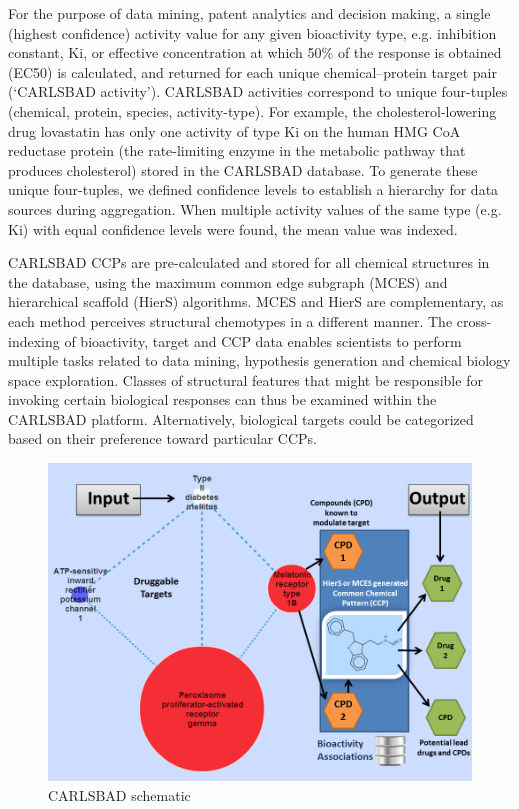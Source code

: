 For the purpose of data mining, patent analytics and decision making, a single (highest confidence) activity value for any given bioactivity type, e.g. inhibition constant, Ki, or effective concentration at which 50\% of the response is obtained (EC50) is calculated, and returned for each unique chemical–protein target pair (‘CARLSBAD activity’). CARLSBAD activities correspond to unique four-tuples (chemical, protein, species, activity-type). For example, the cholesterol-lowering drug lovastatin has only one activity of type Ki on the human HMG CoA reductase protein (the rate-limiting enzyme in the metabolic pathway that produces cholesterol) stored in the CARLSBAD database. To generate these unique four-tuples, we defined confidence levels to establish a hierarchy for data sources during aggregation. When multiple activity values of the same type (e.g. Ki) with equal confidence levels were found, the mean value was indexed.

CARLSBAD CCPs are pre-calculated and stored for all chemical structures in the database, using the maximum common edge subgraph (MCES) and hierarchical scaffold (HierS) algorithms. MCES and HierS are complementary, as each method perceives structural chemotypes in a different manner. The cross-indexing of bioactivity, target and CCP data enables scientists to perform multiple tasks related to data mining, hypothesis generation and chemical biology space exploration. Classes of structural features that might be responsible for invoking certain biological responses can thus be examined within the CARLSBAD platform. Alternatively, biological targets could be categorized based on their preference toward particular CCPs.


\begin{figure}
    \centering
    \includegraphics[width=\textwidth]{figures/carlsbad/CB1_Screenshots.png}
    \caption{CARLSBAD schematic}
    \label{fig:cb_schematic}
\end{figure}

